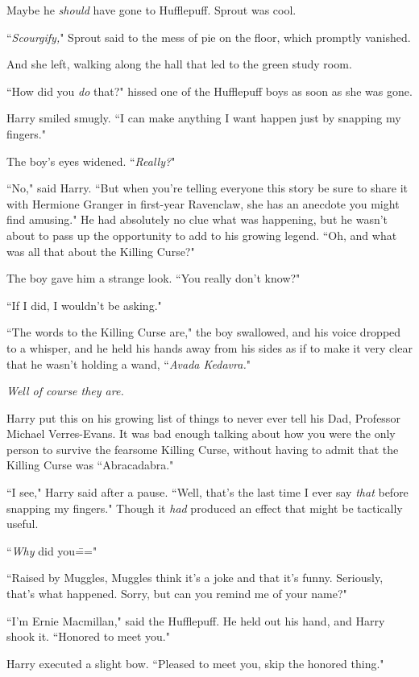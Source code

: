 Maybe he \emph{should} have gone to Hufflepuff. Sprout was cool.

``\emph{Scourgify,}" Sprout said to the mess of pie on the floor, which promptly vanished.

And she left, walking along the hall that led to the green study room.

``How did you \emph{do} that?" hissed one of the Hufflepuff boys as soon as she was gone.

Harry smiled smugly. ``I can make anything I want happen just by snapping my fingers."

The boy's eyes widened. ``\emph{Really?}"

``No," said Harry. ``But when you're telling everyone this story be sure to share it with Hermione Granger in first-year Ravenclaw, she has an anecdote you might find amusing." He had absolutely no clue what was happening, but he wasn't about to pass up the opportunity to add to his growing legend. ``Oh, and what was all that about the Killing Curse?"

The boy gave him a strange look. ``You really don't know?"

``If I did, I wouldn't be asking."

``The words to the Killing Curse are," the boy swallowed, and his voice dropped to a whisper, and he held his hands away from his sides as if to make it very clear that he wasn't holding a wand, ``\emph{Avada Kedavra.}"

\emph{Well of course they are.}

Harry put this on his growing list of things to never ever tell his Dad, Professor Michael Verres-Evans. It was bad enough talking about how you were the only person to survive the fearsome Killing Curse, without having to admit that the Killing Curse was ``Abracadabra."

``I see," Harry said after a pause. ``Well, that's the last time I ever say \emph{that} before snapping my fingers." Though it \emph{had} produced an effect that might be tactically useful.

``\emph{Why} did you\==="

``Raised by Muggles, Muggles think it's a joke and that it's funny. Seriously, that's what happened. Sorry, but can you remind me of your name?"

``I'm Ernie Macmillan," said the Hufflepuff. He held out his hand, and Harry shook it. ``Honored to meet you."

Harry executed a slight bow. ``Pleased to meet you, skip the honored thing."

